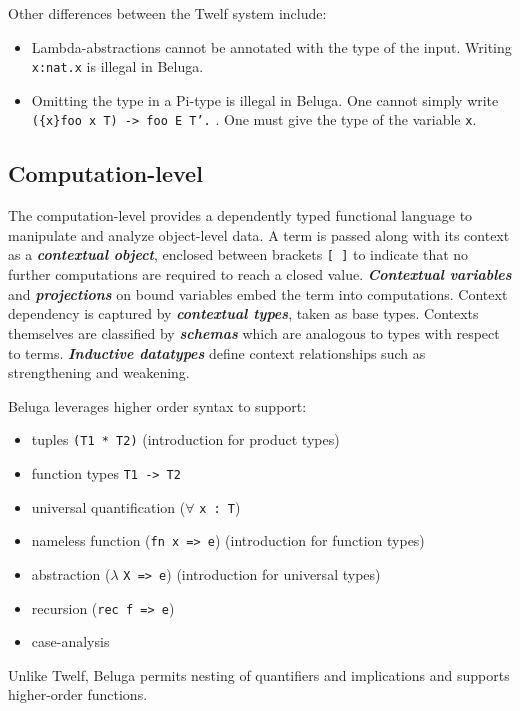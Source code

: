 \documentclass[11pt]{article}
\begin{document}
Other differences between the Twelf system include:
\begin{itemize}
\item Lambda-abstractions cannot be annotated with the type of the input. Writing \texttt{\\x:nat.x} is illegal in Beluga.
\item Omitting the type in a Pi-type is illegal in Beluga. One cannot simply write \texttt{(\{x\}foo x T) -> foo E T'.} . One must give the type of the variable \texttt{x}.
\end{itemize}



\subsection{Computation-level}
The computation-level provides a dependently typed functional language to manipulate and analyze object-level data. A term is passed along with its context as a \textbf{\textit{contextual object}}, enclosed between brackets \texttt{[ ]} to indicate that no further computations are required to reach a closed value. \textbf{\textit{Contextual variables}} and \textbf{\textit{projections}} on bound variables embed the term into computations. Context dependency is captured by \textit{\textbf{contextual types}}, taken as base types. Contexts themselves are classified by \textit{\textbf{schemas}} which are analogous to types with respect to terms. \textit{\textbf{Inductive datatypes}} define context relationships such as strengthening and weakening.

Beluga leverages higher order syntax to support:
\begin{itemize}
\item tuples \texttt{(T1 * T2)} (introduction for product types)
\item function types \texttt{T1 -> T2}
\item universal quantification ($\forall$ \texttt{x : T})
\item nameless function (\texttt{fn x => e}) (introduction for function types)
\item abstraction ($\lambda$ \texttt{X => e}) (introduction for universal types)
\item recursion (\texttt{rec f => e})
\item case-analysis
\end{itemize}
Unlike Twelf, Beluga permits nesting of quantifiers and implications and supports higher-order functions.
\end{document}
